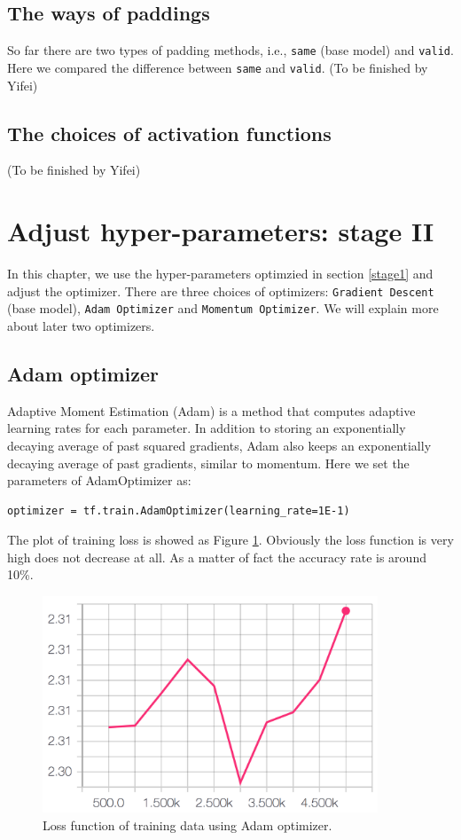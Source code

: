 \documentclass[11pt]{article}
\begin{document}
\subsection{The ways of paddings}
So far there are two types of padding methods, i.e., {\tt same} (base model) and {\tt valid}. Here we compared the difference between {\tt same} and {\tt valid}.
(To be finished by Yifei)

\subsection{The choices of activation functions}
(To be finished by Yifei)



\clearpage
\section{Adjust hyper-parameters: stage II}
\label{stage2}
In this chapter, we use the hyper-parameters optimzied in section \ref{stage1} and adjust the optimizer. There are three choices of optimizers: {\tt Gradient Descent} (base model), {\tt Adam Optimizer} and {\tt Momentum Optimizer}. We will explain more about later two optimizers.



\subsection{Adam optimizer}
Adaptive Moment Estimation (Adam) is a method that computes adaptive learning rates for each parameter. In addition to storing an exponentially decaying average of past squared gradients, Adam also keeps an exponentially decaying average of past gradients, similar to momentum.
Here we set the parameters of AdamOptimizer as: 

\begin{lstlisting}
optimizer = tf.train.AdamOptimizer(learning_rate=1E-1)
\end{lstlisting}


The plot of training loss is showed as Figure \ref{fig:adam}. Obviously the loss function is very high does not decrease at all.  As a matter of fact the accuracy rate is around 10\%.


\begin{figure}[!htb]
   \centering
   \includegraphics[width=10cm]{images/optimizer-adam.png} %
   \caption{Loss function of training data using Adam optimizer.}
   \label{fig:adam}
\end{figure}
\end{document}

